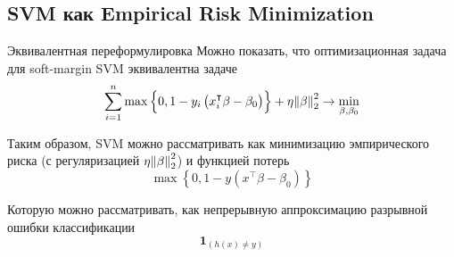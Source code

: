 \subsection{SVM как Empirical Risk Minimization}
\begin{frame}{Эквивалентная переформулировка}
	Можно показать, что оптимизационная задача для soft-margin SVM эквивалентна задаче
	$$
		\sum\limits_{i=1}^n\max\left\{0, 1-y_i\left(x_i^\intercal \beta - \beta_0\right)\right\}+\eta\norm{\beta}^2_2\rightarrow \min\limits_{\beta,\beta_0}
	$$

	Таким образом, SVM можно рассматривать как минимизацию эмпирического риска (с регуляризацией $\eta\norm{\beta}_2^2$) и функцией потерь
	$$\max\left\{0, 1-y\left(x^\intercal \beta - \beta_0\right)\right\}$$

	Которую можно рассматривать, как непрерывную аппроксимацию разрывной ошибки классификации
	$$\mathbf{1}_{\left(h\left(x\right)\neq y\right)}$$
\end{frame}
